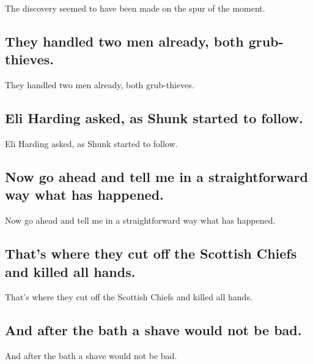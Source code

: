 \documentclass[]{article}
\begin{document}
The discovery seemed to have been made on the spur of the moment.

\hypertarget{they-handled-two-men-already-both-grub-thieves.}{%
\subsection{They handled two men already, both
grub-thieves.}\label{they-handled-two-men-already-both-grub-thieves.}}

They handled two men already, both grub-thieves.

\hypertarget{eli-harding-asked-as-shunk-started-to-follow.}{%
\subsection{Eli Harding asked, as Shunk started to
follow.}\label{eli-harding-asked-as-shunk-started-to-follow.}}

Eli Harding asked, as Shunk started to follow.

\hypertarget{now-go-ahead-and-tell-me-in-a-straightforward-way-what-has-happened.}{%
\subsection{Now go ahead and tell me in a straightforward way what has
happened.}\label{now-go-ahead-and-tell-me-in-a-straightforward-way-what-has-happened.}}

Now go ahead and tell me in a straightforward way what has happened.

\hypertarget{thats-where-they-cut-off-the-scottish-chiefs-and-killed-all-hands.}{%
\subsection{That's where they cut off the Scottish Chiefs and killed all
hands.}\label{thats-where-they-cut-off-the-scottish-chiefs-and-killed-all-hands.}}

That's where they cut off the Scottish Chiefs and killed all hands.

\hypertarget{and-after-the-bath-a-shave-would-not-be-bad.}{%
\subsection{And after the bath a shave would not be
bad.}\label{and-after-the-bath-a-shave-would-not-be-bad.}}

And after the bath a shave would not be bad.
\end{document}
